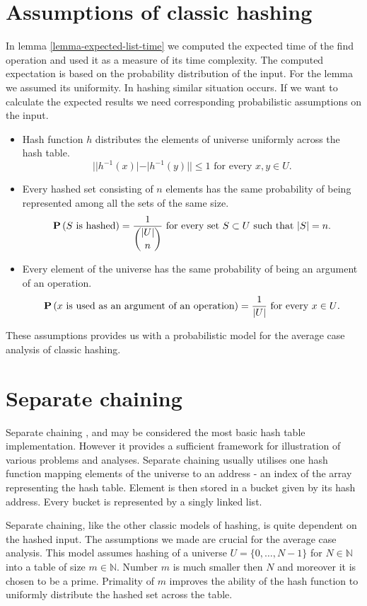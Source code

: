\section{Assumptions of classic hashing}
In lemma \ref{lemma-expected-list-time} we computed the expected time of the find operation and used it as a measure of its time complexity. The computed expectation is based on the probability distribution of the input. For the lemma we assumed its uniformity. In hashing similar situation occurs. If we want to calculate the expected results we need corresponding probabilistic assumptions on the input.
\begin{itemize}
\item Hash function $h$ distributes the elements of universe uniformly across the hash table.
\[
||h^{-1}(x)| - |h^{-1}(y)|| \leq 1 \text{ for every }x, y \in U \text{.}
\]
\item Every hashed set consisting of $n$ elements has the same probability of being represented among all the sets of the same size.
\[
\mathbf{P}\left(S \text{ is hashed}\right) = \frac{1}{\dbinom{|U|}{n}} \text{ for every set } S \subset U \text{ such that } |S| = n \text{.}
\]
\item Every element of the universe has the same probability of being an argument of an operation.
\[
\mathbf{P}\left(x \text{ is used as an argument of an operation}\right) = \frac{1}{|U|} \text{ for every } x \in U \text{.}
\]
\end{itemize}

These assumptions provides us with a probabilistic model for the average case analysis of classic hashing.

\section{Separate chaining}
Separate chaining \cite{The-art-of-computer-programming}, \cite{DBLP:books/sp/Mehlhorn84} and \cite{DBLP:books/sp/MehlhornS2008} may be considered the most basic hash table implementation. However it provides a sufficient framework for illustration of various problems and analyses. Separate chaining usually utilises one hash function mapping elements of the universe to an address - an index of the array representing the hash table. Element is then stored in a bucket given by its hash address. Every bucket is represented by a singly linked list. 

Separate chaining, like the other classic models of hashing, is quite dependent on the hashed input. The assumptions we made are crucial for the average case analysis. This model assumes hashing of a universe $U = \{0, \dots, N - 1\}$ for $N \in \mathbb{N}$ into a table of size $m \in \mathbb{N}$. Number $m$ is much smaller then $N$ and moreover it is chosen to be a prime. Primality of $m$ improves the ability of the hash function to uniformly distribute the hashed set across the table. 

